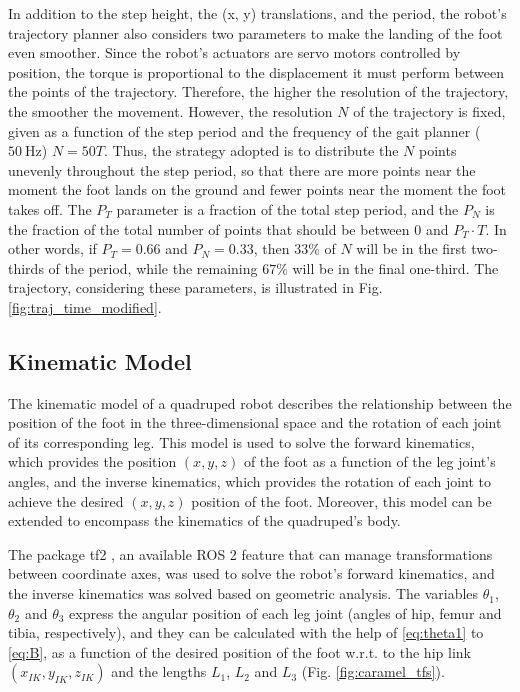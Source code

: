 \documentclass[conference]{IEEEtran}
\begin{document}
In addition to the step height, the (x, y) translations, and the period, the robot's trajectory planner also considers two parameters to make the landing of the foot even smoother. Since the robot’s actuators are servo motors controlled by position, the torque is proportional to the displacement it must perform between the points of the trajectory. Therefore, the higher the resolution of the trajectory, the smoother the movement. However, the resolution $N$ of the trajectory is fixed, given as a function of the step period and the frequency of the gait planner ($\SI{50}{\hertz}$) $N = 50T$. Thus, the strategy adopted is to distribute the $N$ points unevenly throughout the step period, so that there are more points near the moment the foot lands on the ground and fewer points near the moment the foot takes off. The $P_T$ parameter is a fraction of the total step period, and the $P_N$ is the fraction of the total number of points that should be between $0$ and $P_T \cdot T$. In other words, if $P_T = 0.66$ and $P_N = 0.33$, then 33\% of $N$ will be in the first two-thirds of the period, while the remaining $67\%$ will be in the final one-third. The trajectory, considering these parameters, is illustrated in Fig. \ref{fig:traj_time_modified}.

\subsection{Kinematic Model}
\label{sec:detail_inv_kinematics}

The kinematic model of a quadruped robot describes the relationship between the position of the foot in the three-dimensional space and the rotation of each joint of its corresponding leg. This model is used to solve the forward kinematics, which provides the position $(x, y, z)$ of the foot as a function of the leg joint's angles, and the inverse kinematics, which provides the rotation of each joint to achieve the desired $(x, y, z)$ position of the foot. Moreover, this model can be extended to encompass the kinematics of the quadruped's body.

The package tf2 \cite{tf2}, an available ROS 2 feature that can manage transformations between coordinate axes, was used to solve the robot's forward kinematics, and the inverse kinematics was solved based on geometric analysis. The variables $\theta_1$, $\theta_2$ and $\theta_3$ express the angular position of each leg joint (angles of hip, femur and tibia, respectively), and they can be calculated with the help of \eqref{eq:theta1} to \eqref{eq:B}, as a function of the desired position of the foot w.r.t. to the hip link $(x_{IK}, y_{IK}, z_{IK})$ and the lengths $L_1$, $L_2$ and $L_3$ (Fig. \ref{fig:caramel_tfs}).
\end{document}
